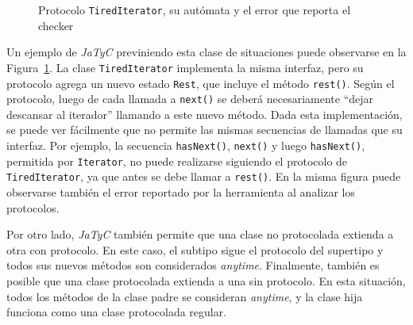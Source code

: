 \begin{figure}[htbp]
\centering
\begin{minipage}[c]{0.50\textwidth}
    
\end{minipage}
\hfill
\begin{minipage}[c]{0.46\textwidth}
\centering
{}
\end{minipage}
\vspace{0.4cm}

\caption{Protocolo \texttt{TiredIterator}, su autómata y el error que reporta el checker}
\label{jatyc:tirediterator_protocol}
\end{figure}

Un ejemplo de \textit{JaTyC} previniendo esta clase de situaciones puede observarse en la Figura~\ref{jatyc:tirediterator_protocol}. La clase \texttt{TiredIterator} implementa la misma interfaz, pero su protocolo agrega un nuevo estado \texttt{Rest}, que incluye el método \texttt{rest()}. Según el protocolo, luego de cada llamada a \texttt{next()} se deberá necesariamente ``dejar descansar al iterador'' llamando a este nuevo método. Dada esta implementación, se puede ver fácilmente que no permite las mismas secuencias de llamadas que su interfaz. Por ejemplo, la secuencia \texttt{hasNext()}, \texttt{next()} y luego \texttt{hasNext()}, permitida por \texttt{Iterator}, no puede realizarse siguiendo el protocolo de \texttt{TiredIterator}, ya que antes se debe llamar a \texttt{rest()}. En la misma figura puede observarse también el error reportado por la herramienta al analizar los protocolos.

Por otro lado, \textit{JaTyC} también permite que una clase no protocolada extienda a otra con protocolo. En este caso, el subtipo sigue el protocolo del supertipo y todos sus nuevos métodos son considerados \textit{anytime}. Finalmente, también es posible que una clase protocolada extienda a una sin protocolo. En esta situación, todos los métodos de la clase padre se consideran \textit{anytime}, y la clase hija funciona como una clase protocolada regular.

